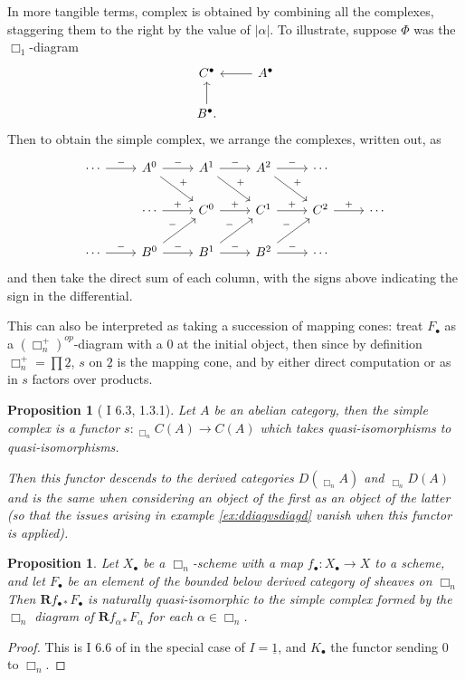 \documentclass[proquest]{uwthesis}[2014/11/13]
\newtheorem{prop}[theorem]{Proposition}
\theoremstyle{definition}
\DeclareMathOperator{\Diag}{\underline{Diag}}
\newcommand{\bR}{\textbf{R}}
\newcommand{\tu}{\underline{2}}
\begin{document}
In more tangible terms, complex is obtained by combining all the complexes, staggering them to the right by the value of $|\alpha|$.
To illustrate, suppose $\Phi$ was the $\Box_1$-diagram
\[
\begin{tikzcd}
C^\bullet & \arrow{l} A^\bullet \\
B^\bullet \arrow{u}.
\end{tikzcd}
\]
Then to obtain the simple complex, we arrange the complexes, written out, as
\[
\begin{tikzcd}
\cdots \arrow{r}{-} &  A^0 \arrow{r}{-} \arrow{dr}{+} & A^1 \arrow{r}{-} \arrow{dr}{+} & A^2 \arrow{r}{-} \arrow{dr}{+} & \cdots \\
& \cdots \arrow{r}{+} & C^0 \arrow{r}{+} & C^1 \arrow{r}{+} & C^2 \arrow{r}{+} & \cdots \\
\cdots \arrow{r}{-} & B^0 \arrow{r}{-} \arrow{ur}{-} & B^1 \arrow{r}{-} \arrow{ur}{-} & B^2 \arrow{r}{-} \arrow{ur}{-} & \cdots
\end{tikzcd}
\]
and then take the direct sum of each column, with the signs above indicating the sign in the differential.

This can also be interpreted as taking a succession of mapping cones: treat $F_\bullet$ as a $(\Box_n^+)^{op}$-diagram with a 0 at the initial object, then since by definition $\Box_n^+ = \prod \tu$, $s$ on $\tu$ is the mapping cone, and by either direct computation or as in \cite{Guillen2002} $s$ factors over products.

\begin{prop}[\cite{Guillen1988} I 6.3, \cite{Guillen2002} 1.3.1]
	Let $A$ be an abelian category, then the simple complex is a functor $s:\Diag_{\Box_n} C(A) \rightarrow C(A)$ which takes quasi-isomorphisms to quasi-isomorphisms.
	
	Then this functor descends to the derived categories $D(\Diag_{\Box_n} A)$ and $\Diag_{\Box_n} D(A)$ and is the same when considering an object of the first as an object of the latter (so that the issues arising in example \ref{ex:ddiagvsdiagd} vanish when this functor is applied).
\end{prop}
\begin{prop}
	\label{thm:simple}
	Let $X_\bullet$ be a $\Box_n$-scheme with a map $f_\bullet : X_\bullet \rightarrow X$ to a scheme, and let $F_\bullet$ be an element of the bounded below derived category of sheaves on $\Box_n$
	Then $\bR f_{\bullet *} F_\bullet$ is naturally quasi-isomorphic to the simple complex formed by the $\Box_n$ diagram of $\bR f_{\alpha *} F_\alpha$ for each $\alpha \in \Box_n$.
\end{prop}
\begin{proof}
	This is I 6.6 of \cite{Guillen1988} in the special case of $I = \underline{1}$, and $K_\bullet$ the functor sending 0 to $\Box_n$.
\end{proof}
\end{document}
